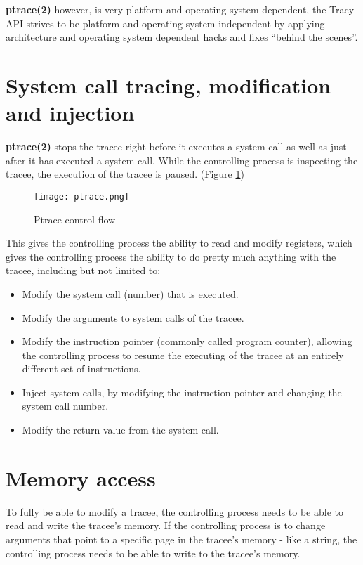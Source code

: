 \documentclass[a4paper, twoside, 10pt, twocolumn]{report}
\begin{document}
\textbf{ptrace(2)} however, is very platform and operating system dependent,
the Tracy API strives to be platform and operating system independent by
applying architecture and operating system dependent hacks and fixes
``behind the scenes''.

\section{System call tracing, modification and injection}

\textbf{ptrace(2)} stops the tracee right before it executes a system call as
well as just after it has executed a system call.
While the controlling process is inspecting the tracee, the execution of the
tracee is paused. (Figure \ref{fig1})


\begin{figure}
\label{fig1}
\texttt{[image: ptrace.png]}
\caption{Ptrace control flow}
\end{figure}

This gives the controlling process the ability to read and modify registers,
which gives the controlling process the ability to do pretty much anything
with the tracee, including but not limited to:

\begin{itemize}
\item Modify the system call (number) that is executed.
\item Modify the arguments to system calls of the tracee.
\item Modify the instruction pointer (commonly called program counter), allowing
    the controlling process to resume the executing of the tracee at an entirely
    different set of instructions.
\item Inject system calls, by modifying the instruction pointer and changing the
    system call number.
\item Modify the return value from the system call.
\end{itemize}

\section{Memory access}

To fully be able to modify a tracee, the controlling process needs to be able to
read and write the tracee's memory. If the controlling process is to change
arguments that point to a specific page in the tracee's memory - like a string,
the controlling process needs to be able to write to the tracee's memory.
\end{document}
